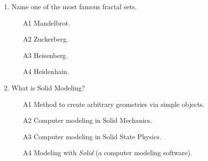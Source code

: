 \documentclass[article,A4,12pt]{llncs}
\begin{document}
\begin{enumerate}
\begin{enumerate}
\end{enumerate}
\item Name one of the most famous fractal sets.
\begin{enumerate}
\item[A1] Mandelbrot.
\item[A2] Zuckerberg.
\item[A3] Heisenberg.
\item[A4] Heidenhain.
\end{enumerate}
\item What is Solid Modeling?
\begin{enumerate}
\item[A1] Method to create arbitrary geometries via simple objects.
\item[A2] Computer modeling in Solid Mechanics.
\item[A3] Computer modeling in Solid State Physics.
\item[A4] Modeling with {\em Solid} (a computer modeling software).
\end{enumerate}
\end{enumerate}
\end{document}
